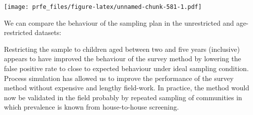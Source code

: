 \documentclass[12pt,a4paper]{book}
\newenvironment{Shaded}{\begin{snugshade}}{\end{snugshade}}
\newcommand{\DataTypeTok}[1]{\textcolor[rgb]{0.13,0.29,0.53}{#1}}
\newcommand{\DecValTok}[1]{\textcolor[rgb]{0.00,0.00,0.81}{#1}}
\newcommand{\FloatTok}[1]{\textcolor[rgb]{0.00,0.00,0.81}{#1}}
\newcommand{\KeywordTok}[1]{\textcolor[rgb]{0.13,0.29,0.53}{\textbf{#1}}}
\newcommand{\NormalTok}[1]{#1}
\newcommand{\OperatorTok}[1]{\textcolor[rgb]{0.81,0.36,0.00}{\textbf{#1}}}
\newcommand{\OtherTok}[1]{\textcolor[rgb]{0.56,0.35,0.01}{#1}}
\newcommand{\StringTok}[1]{\textcolor[rgb]{0.31,0.60,0.02}{#1}}
\theoremstyle{definition}
\theoremstyle{definition}
\theoremstyle{definition}
\theoremstyle{remark}
\begin{document}
\texttt{[image: prfe\_files/figure-latex/unnamed-chunk-581-1.pdf]}

We can compare the behaviour of the sampling plan in the unrestricted
and age-restricted datasets:

\begin{Shaded}
\end{Shaded}

Restricting the sample to children aged between two and five years
(inclusive) appears to have improved the behaviour of the survey method
by lowering the false positive rate to close to expected behaviour under
ideal sampling condition. Process simulation has allowed us to improve
the performance of the survey method without expensive and lengthy
field-work. In practice, the method would now be validated in the field
probably by repeated sampling of communities in which prevalence is
known from house-to-house screening.
\end{document}

